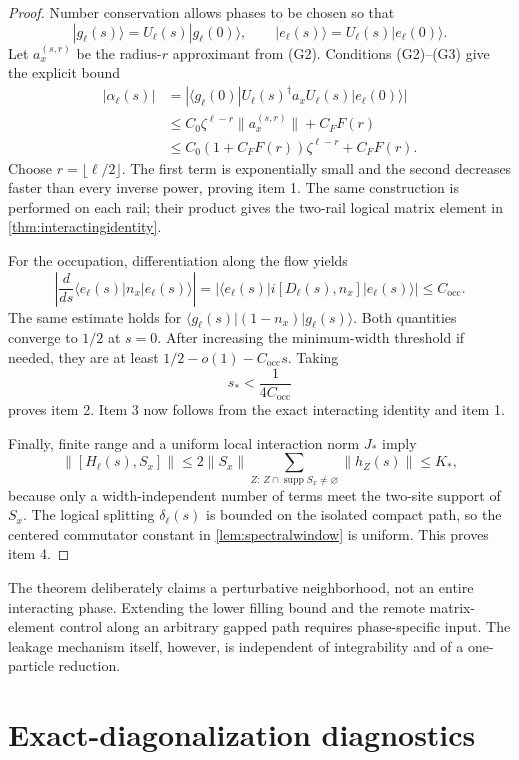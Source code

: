 \documentclass[11pt,a4paper]{article}
\theoremstyle{remark}
\DeclareMathOperator{\supp}{supp}
\begin{document}
\begin{proof}
Number conservation allows phases to be chosen so that
\[
 |g_\ell(s)\rangle=U_\ell(s)|g_\ell(0)\rangle,
 \qquad
 |e_\ell(s)\rangle=U_\ell(s)|e_\ell(0)\rangle.
\]
Let $a_x^{(s,r)}$ be the radius-$r$ approximant from (G2).  Conditions (G2)--(G3) give the explicit bound
\begin{align}
 |\alpha_\ell(s)|
 &=|\langle g_\ell(0)|U_\ell(s)^\dagger a_xU_\ell(s)|e_\ell(0)\rangle|\\
 &\le C_0\zeta^{\ell-r}\|a_x^{(s,r)}\|+C_FF(r)\\
 &\le C_0(1+C_FF(r))\zeta^{\ell-r}+C_FF(r).
\end{align}
Choose $r=\lfloor\ell/2\rfloor$.  The first term is exponentially small and the second decreases faster than every inverse power, proving item 1.  The same construction is performed on each rail; their product gives the two-rail logical matrix element in \cref{thm:interactingidentity}.

For the occupation, differentiation along the flow yields
\[
 \left|\frac{d}{ds}\langle e_\ell(s)|n_x|e_\ell(s)\rangle\right|
 =|\langle e_\ell(s)|i[D_\ell(s),n_x]|e_\ell(s)\rangle|
 \le C_{\mathrm{occ}}.
\]
The same estimate holds for $\langle g_\ell(s)|(1-n_x)|g_\ell(s)\rangle$.  Both quantities converge to $1/2$ at $s=0$.  After increasing the minimum-width threshold if needed, they are at least $1/2-o(1)-C_{\mathrm{occ}}s$.  Taking
\[
 s_*<\frac{1}{4C_{\mathrm{occ}}}
\]
proves item 2.  Item 3 now follows from the exact interacting identity and item 1.

Finally, finite range and a uniform local interaction norm $J_*$ imply
\[
 \|[H_\ell(s),S_x]\|
 \le2\|S_x\|\sum_{Z:\,Z\cap\supp S_x\ne\varnothing}\|h_Z(s)\|
 \le K_*,
\]
because only a width-independent number of terms meet the two-site support of $S_x$.  The logical splitting $\delta_\ell(s)$ is bounded on the isolated compact path, so the centered commutator constant in \cref{lem:spectralwindow} is uniform.  This proves item 4.
\end{proof}

The theorem deliberately claims a perturbative neighborhood, not an entire interacting phase.  Extending the lower filling bound and the remote matrix-element control along an arbitrary gapped path requires phase-specific input.  The leakage mechanism itself, however, is independent of integrability and of a one-particle reduction.

\section{Exact-diagonalization diagnostics}
\end{document}
